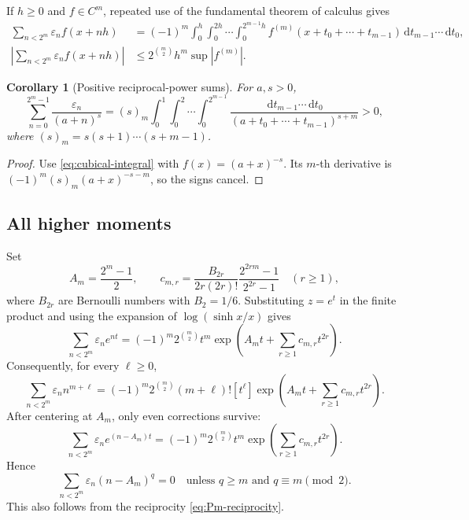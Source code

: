 \documentclass[11pt,oneside]{article}
\numberwithin{equation}{section}
\newtheorem{corollary}[theorem]{Corollary}
\theoremstyle{definition}
\theoremstyle{remark}
\newcommand{\eps}{\varepsilon}
\newcommand{\dd}{\,\mathrm d}
\begin{document}
If \(h\ge0\) and \(f\in C^m\), repeated use of the fundamental theorem of
calculus gives
\begin{align}
 \sum_{n<2^m}\eps_nf(x+nh)
 &=(-1)^m\int_0^h\int_0^{2h}\cdots\int_0^{2^{m-1}h}
 f^{(m)}(x+t_0+\cdots+t_{m-1})
 \dd t_{m-1}\cdots\dd t_0,
 \label{eq:cubical-integral}\\
 \left|\sum_{n<2^m}\eps_nf(x+nh)\right|
 &\le 2^{\binom m2}h^m
 \sup|f^{(m)}|.
 \label{eq:cubical-bound}
\end{align}

\begin{corollary}[Positive reciprocal-power sums]
For \(a,s>0\),
\begin{equation}
 \boxed{\sum_{n=0}^{2^m-1}\frac{\eps_n}{(a+n)^s}
 =(s)_m\int_0^1\int_0^2\cdots\int_0^{2^{m-1}}
 \frac{\dd t_{m-1}\cdots\dd t_0}
 {(a+t_0+\cdots+t_{m-1})^{s+m}}>0,}
 \label{eq:positive-reciprocal}
\end{equation}
where \((s)_m=s(s+1)\cdots(s+m-1)\).
\end{corollary}

\begin{proof}
Use \eqref{eq:cubical-integral} with \(f(x)=(a+x)^{-s}\).  Its \(m\)-th
derivative is \((-1)^m(s)_m(a+x)^{-s-m}\), so the signs cancel.
\end{proof}

\subsection{All higher moments}

Set
\begin{equation}
 A_m=\frac{2^m-1}{2},\qquad
 c_{m,r}=\frac{B_{2r}}{2r(2r)!}
 \frac{2^{2rm}-1}{2^{2r}-1}\quad(r\ge1),
 \label{eq:moment-constants}
\end{equation}
where \(B_{2r}\) are Bernoulli numbers with \(B_2=1/6\).  Substituting
\(z=e^t\) in the finite product and using the expansion of
\(\log(\sinh x/x)\) gives
\begin{equation}
 \boxed{\sum_{n<2^m}\eps_ne^{nt}
 =(-1)^m2^{\binom m2}t^m
 \exp\!\left(A_mt+\sum_{r\ge1}c_{m,r}t^{2r}\right).}
 \label{eq:exponential-moment-factor}
\end{equation}
Consequently, for every \(\ell\ge0\),
\begin{equation}
 \boxed{\sum_{n<2^m}\eps_nn^{m+\ell}
 =(-1)^m2^{\binom m2}(m+\ell)!
 [t^\ell]\exp\!\left(A_mt+\sum_{r\ge1}c_{m,r}t^{2r}\right).}
 \label{eq:all-power-moments}
\end{equation}
After centering at \(A_m\), only even corrections survive:
\begin{equation}
 \sum_{n<2^m}\eps_ne^{(n-A_m)t}
 =(-1)^m2^{\binom m2}t^m
 \exp\!\left(\sum_{r\ge1}c_{m,r}t^{2r}\right).
 \label{eq:centered-mgf}
\end{equation}
Hence
\begin{equation}
 \sum_{n<2^m}\eps_n(n-A_m)^q=0
 \quad\text{unless }q\ge m\text{ and }q\equiv m\pmod2.
 \label{eq:centered-parity}
\end{equation}
This also follows from the reciprocity \eqref{eq:Pm-reciprocity}.
\end{document}

